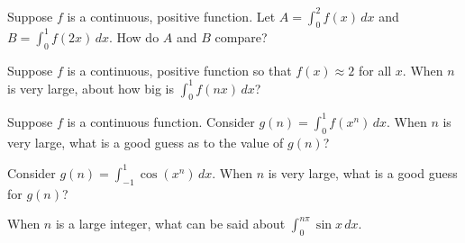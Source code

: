 \documentclass{ximera}
\newcommand{\recommendation}[1]{}
\begin{document}
\begin{problem}
  Suppose $f$ is a continuous, positive function.  Let $A = \int_0^2 f(x) \, dx$ and $B = \int_0^1 f(2x) \, dx$.  How do $A$ and $B$ compare?
  \begin{multipleChoice}
  \end{multipleChoice}
\end{problem}

\begin{problem}
\recommendation{Vic}
  Suppose $f$ is a continuous, positive function so that $f(x) \approx 2$ for all $x$.  When $n$ is very large, about how big is $\int_0^1 f(nx) \, dx$?
  \begin{multipleChoice}
   \end{multipleChoice}
\end{problem}

\begin{problem}
  Suppose $f$ is a continuous function.  Consider $g(n) = \int_0^1 f(x^n) \, dx$.  When $n$ is very large, what is a good guess as to the value of $g(n)$?
  \begin{multipleChoice}
  \end{multipleChoice}
\end{problem}

\begin{problem}
  Consider $g(n) = \int_{-1}^1 \cos(x^n) \, dx$.  When $n$ is very large, what is a good guess for $g(n)$?
  \begin{multipleChoice}
  \end{multipleChoice}
\end{problem}



\begin{problem}
  When $n$ is a large integer, what can be said about $\int_0^{n \pi} \sin x \, dx$.
  \begin{multipleChoice}
  \end{multipleChoice}
\end{problem}
\end{document}
